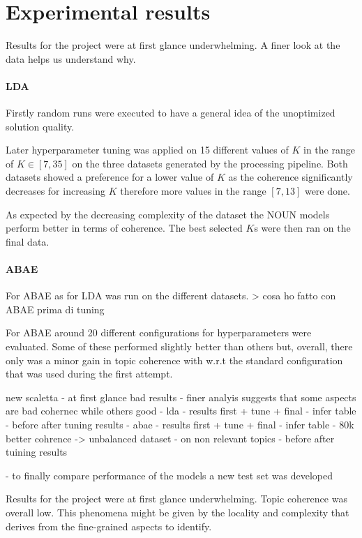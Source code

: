 \section{Experimental results}

Results for the project were at first glance underwhelming.
A finer look at the data helps us understand why.

\paragraph{LDA}
Firstly random runs were executed to have a general idea of the unoptimized solution quality.

Later hyperparameter tuning was applied on 15 different values of $K$ in the range of $K\in [7,35]$
on the three datasets generated by the processing pipeline.
Both datasets showed a preference for a lower value of $K$ as the coherence significantly decreases for
increasing $K$ therefore more values in the range $[7,13]$ were done.

As expected by the decreasing complexity of the dataset the NOUN models perform better in terms of coherence.
The best selected $K$s were then ran on the final data.

\paragraph{ABAE}
For ABAE as for LDA was run on the different datasets.
> cosa ho fatto con ABAE prima di tuning

For ABAE around 20 different configurations for hyperparameters were evaluated.
Some of these performed slightly better than others but, overall, there only was a minor gain in topic coherence with
w.r.t the standard configuration that was used during the first attempt.

new scaletta
- at first glance bad results
- finer analyis suggests that some aspects are bad cohernec while others good
- lda
    - results first + tune + final
    - infer table
    - before after tuning results
- abae
    - results first + tune + final
    - infer table
    - 80k better cohrence ->  unbalanced dataset
    - on non relevant topics
    - before after tuining results

- to finally compare performance of the models a new test set was developed

Results for the project were at first glance underwhelming.
Topic coherence was overall low.
This phenomena might be given by the locality and complexity that derives from the fine-grained aspects to identify.

